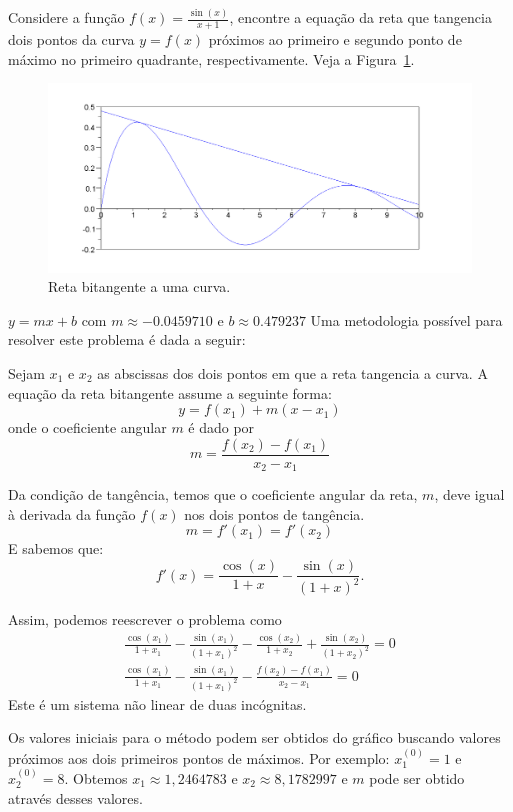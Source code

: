 \begin{exer}\label{prob_bitang}Considere a função $f(x)=\frac{\sin(x)}{x+1}$, encontre a equação da reta que tangencia dois pontos da curva $y=f(x)$ próximos ao primeiro e segundo ponto de máximo no primeiro quadrante, respectivamente. Veja a Figura~\ref{pic:bitang}.
\end{exer}
\begin{figure}
  \centering
  \includegraphics[width=\textwidth]{cap_nlinsis/pics/curva_Q23}
  \caption{Reta bitangente a uma curva.}
  \label{pic:bitang}
\end{figure}
\begin{resp}
  $y=mx+b$ com $m\approx - 0.0459710 $ e $b\approx 0.479237$
  Uma metodologia possível para resolver este problema é dada a seguir:
  
  Sejam $x_1$ e $x_2$ as abscissas dos dois pontos em que a reta tangencia a curva. A equação da reta bitangente assume a seguinte forma:
  $$y=f(x_1) + m(x-x_1) $$
  onde o coeficiente angular $m$ é dado por
  $$m=\frac{f(x_2)-f(x_1)}{x_2-x_1}$$
  
  Da condição de tangência, temos que o coeficiente angular da reta, $m$, deve igual à derivada da função $f(x)$ nos dois pontos de tangência.
  $$m=f'(x_1)=f'(x_2)$$
  E sabemos que:
  $$f'(x)=\frac{\cos(x)}{1+x}-\frac{\sin(x)}{(1+x)^2}.$$
  
  Assim, podemos reescrever o problema como
  \begin{eqnarray*}
\frac{\cos(x_1)}{1+x_1}-\frac{\sin(x_1)}{(1+x_1)^2}-\frac{\cos(x_2)}{1+x_2}+\frac{\sin(x_2)}{(1+x_2)^2}=0\\
\frac{\cos(x_1)}{1+x_1}-\frac{\sin(x_1)}{(1+x_1)^2}-\frac{f(x_2)-f(x_1)}{x_2-x_1}=0
\end{eqnarray*}
Este é um sistema não linear de duas incógnitas.

Os valores iniciais para o método podem ser obtidos do gráfico buscando valores próximos aos dois primeiros pontos de máximos. Por exemplo: $x_1^{(0)}=1$ e $x_2^{(0)}=8$. Obtemos $x_1\approx 1,2464783$ e $x_2\approx 8,1782997$ e $m$ pode ser obtido através desses valores.
\end{resp}

